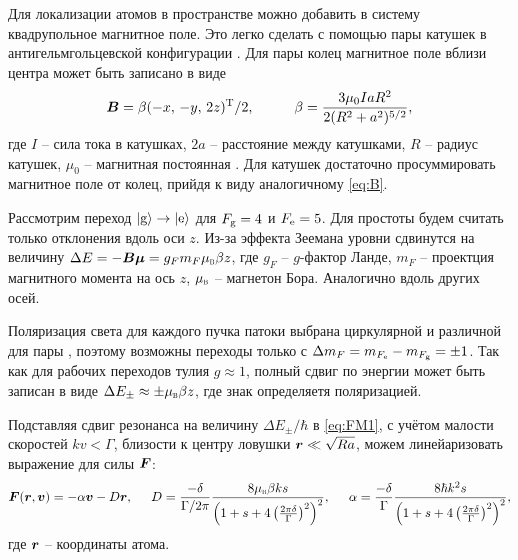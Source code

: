 Для локализации атомов в пространстве можно добавить в систему квадрупольное магнитное поле. Это легко сделать с помощью пары катушек в антигельмгольцевской конфигурации \cite{PhysRevA83}. Для пары колец магнитное поле вблизи центра может быть записано в виде
\begin{equation}
	\vc{B} = \beta (-x,\,  -y,\, 2z)\T/2,
	\hspace{10 mm} 
	\beta = \frac{3 \mu_0 I a R^2}{2(R^2+a^2)^{5/2}},
	\label{eq:B}
\end{equation}
где $I$ -- сила тока в катушках, $2a$ -- расстояние между катушками, $R$ -- радиус катушек, $\mu_0$ -- магнитная постоянная \cite{PhysRevA83}. Для катушек достаточно просуммировать магнитное поле от колец, прийдя к виду аналогичному \eqref{eq:B}. 

Рассмотрим переход $\left| \text{g} \right\rangle \to \left| \text{e} \right\rangle$ для $F_{\textnormal{g}} = 4$ и $F_{\textnormal{e}} = 5$. Для простоты будем считать только отклонения вдоль оси $z$. Из-за эффекта Зеемана уровни сдвинутся на величину $\Delta E = - \vc{B} \vc{\mu} = g_F m_F \subt{\mu}{B} \beta z$, где $g_F$ -- $g$-фактор Ланде, $m_F$ -- проектция магнитного момента на ось $z$, $\subt{\mu}{B}$ -- магнетон Бора. Аналогично вдоль других осей.

Поляризация света для каждого пучка патоки выбрана циркулярной и различной для пары \cite{vlad}, поэтому возможны переходы только с  $\Delta m_F = m_{F_{\textnormal{e}}}-m_{F_{\textnormal{g}}}= \pm 1$. Так как для рабочих переходов тулия $g \approx 1$, полный сдвиг по энергии может быть записан в виде $\Delta E_{\pm} \approx \pm \subt{\mu}{B} \beta z$, где знак определяетя поляризацией. 

Подставляя сдвиг резонанса на величину $\Delta E_{\pm} / \hbar$ в \eqref{eq:FM1}, с учётом малости скоростей $k v < \Gamma$, близости к центру ловушки $\boldsymbol{r} \ll \sqrt{R a}$, можем линейаризовать выражение для силы $\boldsymbol{F}$:
\begin{equation}
	\vc{F}(\vc{r}, \vc{v}) = -\alpha \vc{v} - D \vc{r},
	\hspace{5 mm} 
	D = \frac{-\delta}{\Gamma/2\pi}\frac{8 \subt{\mu}{B} \beta k s}{\left(1+s+4\left(\frac{2\pi \delta}{\Gamma}\right)^2\right)^2},
	\hspace{5 mm} 
	\alpha = \frac{-\delta}{\Gamma} \frac{8 \hbar k^2 s}{\left(1+s+4\left(\frac{2\pi \delta}{\Gamma}\right)^2\right)^2},
\end{equation}
где $\boldsymbol{r}$  -- координаты атома.











